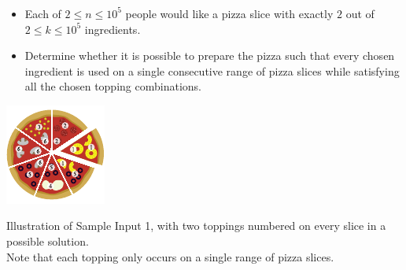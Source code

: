\begin{frame}
    \frametitle{\problemtitle}

    \begin{itemize}
        \item Each of $2 \leq n\leq 10^5$ people would like a pizza slice with
            exactly $2$ out of $2\leq k\leq 10^5$ ingredients.
        \item Determine whether it is possible to prepare the pizza
        such that every chosen ingredient is used on a single consecutive range of pizza slices
        while satisfying all the chosen topping combinations.
    \end{itemize}

    \vspace{1em}

    \centering
    \includegraphics[height=0.4\textheight]{sample.pdf}

    \small
    Illustration of Sample Input 1, with two toppings numbered on every slice in a possible solution. \\
    Note that each topping only occurs on a single range of pizza slices.
\end{frame}
